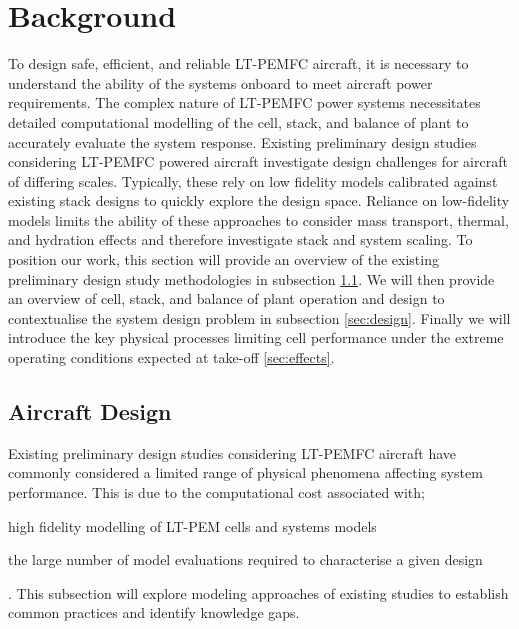 \section{Background} \label{sec:background}
To design safe, efficient, and reliable LT-PEMFC aircraft, it is necessary to understand the ability of the systems onboard to meet aircraft power requirements.
The complex nature of LT-PEMFC power systems necessitates detailed computational modelling of the cell, stack, and balance of plant to accurately evaluate the system response.
Existing preliminary design studies considering LT-PEMFC powered aircraft investigate design challenges for aircraft of differing scales.
Typically, these rely on low fidelity models calibrated against existing stack designs to quickly explore the design space.
Reliance on low-fidelity models limits the ability of these approaches to consider mass transport, thermal, and hydration effects and therefore investigate stack and system scaling.
To position our work, this section will provide an overview of the existing preliminary design study methodologies in subsection \ref{sec:lit}.
We will then provide an overview of cell, stack, and balance of plant operation and design to contextualise the system design problem in subsection \ref{sec:design}.
Finally we will introduce the key physical processes limiting cell performance under the extreme operating conditions expected at take-off \ref{sec:effects}.

\subsection{Aircraft Design} \label{sec:lit}
Existing preliminary design studies considering LT-PEMFC aircraft have commonly considered a limited range of physical phenomena affecting system performance.
This is due to the computational cost associated with; \begin{enumerate*} \item high fidelity modelling of LT-PEM cells and systems models \item the large number of model evaluations required to characterise a given design\end{enumerate*}.
This subsection will explore modeling approaches of existing studies to establish common practices and identify knowledge gaps.

